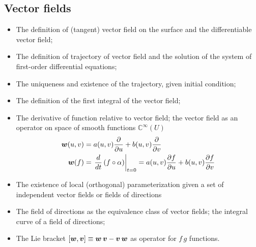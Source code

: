 \documentclass[11pt]{article}
\begin{document}
\subsection{Vector fields}
\begin{itemize}
\item The definition of (tangent) vector field on the surface and the differentiable vector field;
\item The definition of trajectory of vector field and the solution of the system of first-order differential equations;
\item The uniqueness and existence of the trajectory, given initial condition;
\item The definition of the first integral of the vector field;
\item The derivative of function relative to vector field; the vector field as an operator on space of smooth functions $\mathbb{C}^{\infty}(U)$
\begin{align*}
\boldsymbol{w}(u,v) &= a(u,v)\frac{\partial }{ \partial u} + b(u,v)\frac{\partial }{ \partial v}\\
\boldsymbol{w}(f) &= \left.{\frac{d}{dt}\left(f\circ \alpha\right)}\right\vert_{t=0} = a(u,v)\frac{\partial f}{ \partial u} + b(u,v)\frac{\partial f}{ \partial v}
\end{align*}
\item The existence of local (orthogonal) parameterization given a set of independent vector fields or fields of directions
\item The field of directions as the equivalence class of vector fields; the integral curve of a field of directions;
\item The Lie bracket $[\boldsymbol{w}, \boldsymbol{v}]\equiv \boldsymbol{w\,v} - \boldsymbol{v\,w}$ as operator for $f\,g$ functions. 
\end{itemize}
\end{document}
